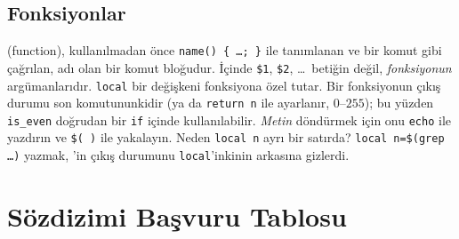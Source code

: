 \subsection{Fonksiyonlar}




 (function), kullanılmadan önce \texttt{name() \{ \ldots; \}} ile tanımlanan ve bir komut gibi çağrılan, adı olan bir komut bloğudur. İçinde \texttt{\$1}, \texttt{\$2}, \ldots\ betiğin değil, \emph{fonksiyonun} argümanlarıdır. \texttt{local} bir değişkeni fonksiyona özel tutar. Bir fonksiyonun çıkış durumu son komutununkidir (ya da \texttt{return n} ile ayarlanır, $0$--$255$); bu yüzden \texttt{is\_even} doğrudan bir \texttt{if} içinde kullanılabilir. \emph{Metin} döndürmek için onu \texttt{echo} ile yazdırın ve \texttt{\$( )} ile yakalayın. Neden \texttt{local n} ayrı bir satırda? \texttt{local n=\$(grep \ldots)} yazmak, 'in çıkış durumunu \texttt{local}'inkinin arkasına gizlerdi.

\section{Sözdizimi Başvuru Tablosu}

